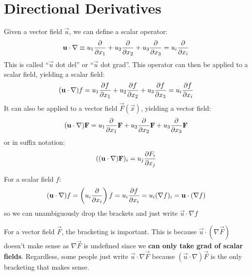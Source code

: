 \documentclass[../main.tex]{subfiles}
\begin{document}
\section{Directional Derivatives}
\label{secUdot}
\begin{definition}
Given a vector field $\vec{u}$, we can define a scalar operator:
\[
  \vec{u} \cdot \nabla \equiv u_1 \pderiv{}{x_1} + u_2 \pderiv{}{x_2} + u_3 \pderiv{}{x_3} = u_i \pderiv{}{x_i}
\]
This is called ``$\vec{u}$ dot del'' or ``$\vec{u}$ dot grad''.
This operator can then be applied to a scalar field, yielding a scalar field:
\[
  (\vec{u} \cdot \nabla)f = u_1 \pderiv{f}{x_1} + u_2 \pderiv{f}{x_2} + u_3 \pderiv{f}{x_3} = u_i \pderiv{f}{x_i}
\]
It can also be applied to a vector field $\vec{F}(\vec{x})$, yielding a vector field:
\[
  (\vec{u} \cdot \nabla)\vec{F} = u_1 \pderiv{}{x_1}\vec{F} + u_2 \pderiv{}{x_2}\vec{F} + u_3 \pderiv{}{x_3}\vec{F}
\]
or in suffix notation:
\[
  ((\vec{u} \cdot \nabla)\vec{F})_i = u_j \pderiv{F_i}{x_j}
\]
\end{definition}
\begin{remark}[Bracketing]
For a scalar field $f$:
\[
  (\vec{u} \cdot \nabla)f = \left(u_i \pderiv{}{x_i}\right)f = u_i \pderiv{f}{x_i} = u_i (\nabla f)_i = \vec{u} \cdot (\nabla f)
\]
so we can unambiguously drop the brackets and just write $\vec{u} \cdot \nabla f$

For a vector field $\vec{F}$, the bracketing is important.
This is because $\vec{u} \cdot (\nabla \vec{F})$ doesn't make sense as $\nabla \vec{F}$ is undefined since we \textbf{can only take grad of scalar fields}.
Regardless, some people just write $\vec{u} \cdot \nabla \vec{F}$ because $(\vec{u} \cdot \nabla)\vec{F}$ is the only bracketing that makes sense.
\end{remark}
\end{document}
